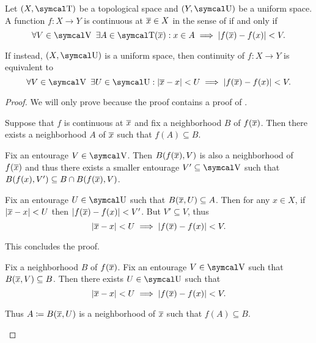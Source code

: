 \begin{proposition}\label{thm:uniform_space_continuity}
  Let \( (X, \CT) \) be a topological space and \( (Y, \CU) \) be a uniform space. A function \( f: X \to Y \) is continuous at \( \overline{x} \in X \) in the sense of  if and only if
  \begin{equation}\label{thm:uniform_space_continuity/topological_source}
    \forall V \in \CV \ \exists A \in \CT(\Ol x) : x \in A \implies \Abs{f(\Ol{x}) - f(x)} < V.
  \end{equation}

  If instead, \( (X, \CU) \) is a uniform space, then continuity of \( f: X \to Y \) is equivalent to
  \begin{equation}\label{thm:uniform_space_continuity/uniform_source}
    \forall V \in \CV \ \exists U \in \CU : \Abs{\Ol{x} - x} < U \implies \Abs{f(\Ol{x}) - f(x)} < V.
  \end{equation}
\end{proposition}
\begin{proof}
  We will only prove  because the proof contains a proof of .

  \begin{description}
    \Implies Suppose that \( f \) is continuous at \( \overline{x} \) and fix a neighborhood \( B \) of \( f(\overline{x}) \). Then there exists a neighborhood \( A \) of \( \overline{x} \) such that \( f(A) \subseteq B \).

    Fix an entourage \( V \in \CV \). Then \( B(f(\overline{x}), V) \) is also a neighborhood of \( f(\overline{x}) \) and thus there exists a smaller entourage \( V' \subseteq \CV \) such that \( B(f(x), V') \subseteq B \cap B(f(\overline{x}), V) \).

    Fix an entourage \( U \in \CU \) such that \( B(\overline{x}, U) \subseteq A \). Then for any \( x \in X \), if \( \left\vert \overline{x} - x \right\vert < U \) then \( \left\vert f(\overline{x}) - f(x) \right\vert < V' \). But \( V' \subseteq V \), thus
    \begin{equation*}
      \left\vert \overline{x} - x \right\vert < U \implies \left\vert f(\overline{x}) - f(x) \right\vert < V.
    \end{equation*}

    This concludes the proof.

    \ImpliedBy Fix a neighborhood \( B \) of \( f(\overline{x}) \). Fix an entourage \( V \in \CV \) such that \( B(\overline{x}, V) \subseteq B \). Then there exists \( U \in \CU \) such that
    \begin{equation*}
      \left\vert \overline{x} - x \right\vert < U \implies \left\vert f(\overline{x}) - f(x) \right\vert < V.
    \end{equation*}

    Thus \( A \coloneqq B(\overline{x}, U) \) is a neighborhood of \( \overline{x} \) such that \( f(A) \subseteq B \).
  \end{description}
\end{proof}

